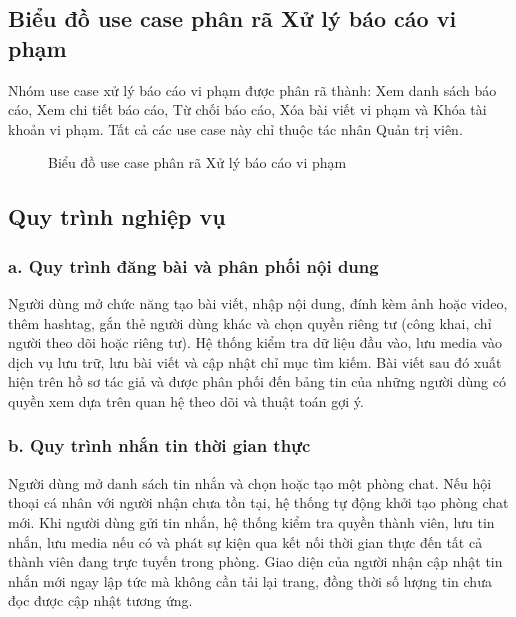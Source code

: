 \documentclass[../DoAn.tex]{subfiles}
\begin{document}
\subsection{Biểu đồ use case phân rã Xử lý báo cáo vi phạm}
\label{subsection:2.2.8}
Nhóm use case xử lý báo cáo vi phạm được phân rã thành: Xem danh sách báo cáo, Xem chi tiết báo cáo, Từ chối báo cáo, Xóa bài viết vi phạm và Khóa tài khoản vi phạm. Tất cả các use case này chỉ thuộc tác nhân Quản trị viên.

\begin{figure}[H]
\centering
{}
\caption{Biểu đồ use case phân rã Xử lý báo cáo vi phạm}
\label{fig:use-case-admin-report}
\end{figure}

\subsection{Quy trình nghiệp vụ}
\label{subsection:2.2.8}

\subsubsection*{a. Quy trình đăng bài và phân phối nội dung}
Người dùng mở chức năng tạo bài viết, nhập nội dung, đính kèm ảnh hoặc video, thêm hashtag, gắn thẻ người dùng khác và chọn quyền riêng tư (công khai, chỉ người theo dõi hoặc riêng tư). Hệ thống kiểm tra dữ liệu đầu vào, lưu media vào dịch vụ lưu trữ, lưu bài viết và cập nhật chỉ mục tìm kiếm. Bài viết sau đó xuất hiện trên hồ sơ tác giả và được phân phối đến bảng tin của những người dùng có quyền xem dựa trên quan hệ theo dõi và thuật toán gợi ý.

\subsubsection*{b. Quy trình nhắn tin thời gian thực}
Người dùng mở danh sách tin nhắn và chọn hoặc tạo một phòng chat. Nếu hội thoại cá nhân với người nhận chưa tồn tại, hệ thống tự động khởi tạo phòng chat mới. Khi người dùng gửi tin nhắn, hệ thống kiểm tra quyền thành viên, lưu tin nhắn, lưu media nếu có và phát sự kiện qua kết nối thời gian thực đến tất cả thành viên đang trực tuyến trong phòng. Giao diện của người nhận cập nhật tin nhắn mới ngay lập tức mà không cần tải lại trang, đồng thời số lượng tin chưa đọc được cập nhật tương ứng.
\end{document}
